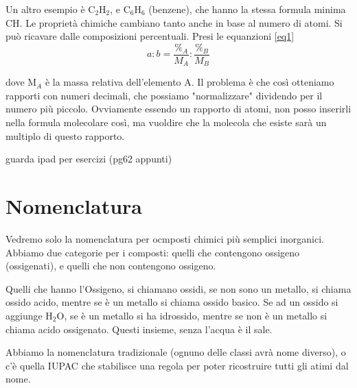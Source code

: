 \documentclass[a4paper]{article}
\begin{document}
Un altro esempio è C$_2$H$_2$, e C$_6$H$_6$ (benzene), che hanno la stessa formula minima CH. Le proprietà chimiche cambiano tanto anche in base al numero di atomi. Si può ricavare dalle composizioni percentuali. Presi le equanzioni \ref{eq1}
\begin{equation*}
    a:b = \frac{\%_A}{M_A}:\frac{\%_B}{M_B}
\end{equation*}

dove M$_A$ è la massa relativa dell'elemento A. Il problema è che così otteniamo rapporti con numeri decimali, che possiamo "normalizzare" dividendo per il numero più piccolo. Ovviamente essendo un rapporto di atomi, non posso inserirli nella formula molecolare così, ma vuoldire che la molecola che esiste sarà un multiplo di questo rapporto. 


guarda ipad per esercizi (pg62 appunti)

\section{Nomenclatura}
Vedremo solo la nomenclatura per ocmposti chimici più semplici inorganici. Abbiamo due categorie per i composti: quelli che contengono ossigeno (ossigenati), e quelli che non contengono ossigeno. 

Quelli che hanno l'Ossigeno, si chiamano ossidi, se non sono un metallo, si chiama ossido acido, mentre se è un metallo si chiama ossido basico. 
Se ad un ossido si aggiunge H$_2$O, se è un metallo si ha idrossido, mentre se non è un metallo si chiama acido ossigenato. Questi insieme, senza l'acqua è il sale. 

Abbiamo la nomenclatura tradizionale (ognuno delle classi avrà nome diverso), o c'è quella IUPAC che stabilisce una regola per poter ricostruire tutti gli atimi dal nome. 
\end{document}
